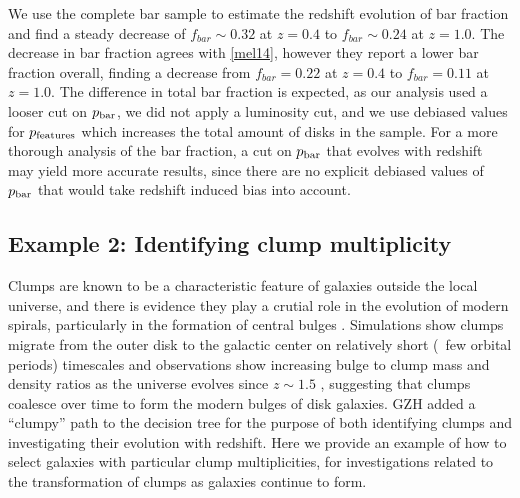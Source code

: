 \documentclass[twocolumn]{aastex6}
\begin{document}
We use the complete bar sample to estimate the redshift evolution of bar fraction and find a steady decrease of $f_{bar} \sim 0.32$ at $z=0.4$ to $f_{bar} \sim 0.24$ at $z=1.0$. The decrease in bar fraction agrees with \ref{mel14}, however they report a lower bar fraction overall, finding a decrease from $f_{bar}=0.22$ at $z=0.4$ to $f_{bar}=0.11$ at $z=1.0$. The difference in total bar fraction is expected, as our analysis used a looser cut on $p_{\rm bar}$, we did not apply a luminosity cut, and we use debiased values for $p_{\rm features}$ which increases the total amount of disks in the sample. For a more thorough analysis of the bar fraction, a cut on $p_{\rm bar}$ that evolves with redshift may yield more accurate results, since there are no explicit debiased values of $p_{\rm bar}$ that would take redshift induced bias into account. 

\subsection{Example 2: Identifying clump multiplicity}
Clumps are known to be a characteristic feature of galaxies outside the local universe, and there is evidence they play a crutial role in the evolution of modern spirals, particularly in the formation of central bulges \citep{elm05,elm14,guo15,beh16}. Simulations show clumps migrate from the outer disk to the galactic center on relatively short (~few orbital periods) timescales \citep{man15} and observations show increasing bulge to clump mass and density ratios as the universe evolves since $z\sim 1.5$ \citep{elm09}, suggesting that clumps coalesce over time to form the modern bulges of disk galaxies. GZH added a ``clumpy'' path to the decision tree for the purpose of both identifying clumps and investigating their evolution with redshift. Here we provide an example of how to select galaxies with particular clump multiplicities, for investigations related to the transformation of clumps as galaxies continue to form. 
\end{document}
